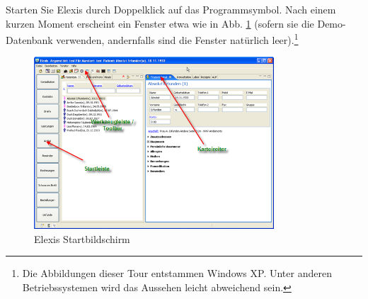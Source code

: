 
Starten Sie Elexis durch Doppelklick auf das Programmsymbol.
Nach einem kurzen Moment erscheint ein Fenster etwa wie in Abb. \ref{fig:startbild} (sofern sie die
Demo-Datenbank verwenden, andernfalls sind die Fenster natürlich
leer).\footnote{Die Abbildungen dieser Tour entstammen Windows XP. Unter anderen Betriebssystemen wird das Aussehen leicht abweichend sein.}
 \begin{figure}[ht]
	\includegraphics[width=0.8\textwidth]{images/einf0}
	\caption{Elexis Startbildschirm}
	\label{fig:startbild}
\end{figure}
